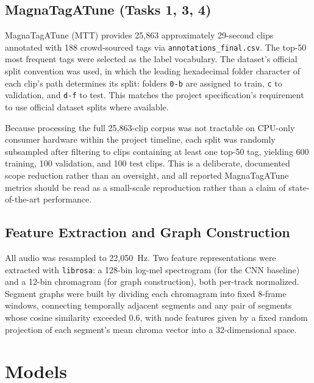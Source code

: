 \documentclass[conference]{IEEEtran}
\begin{document}
\subsection{MagnaTagATune (Tasks 1, 3, 4)}
MagnaTagATune (MTT) provides 25{,}863 approximately 29-second clips annotated with 188 crowd-sourced tags via \texttt{annotations\_final.csv}. The top-50 most frequent tags were selected as the label vocabulary. The dataset's official split convention was used, in which the leading hexadecimal folder character of each clip's path determines its split: folders \texttt{0-b} are assigned to train, \texttt{c} to validation, and \texttt{d-f} to test. This matches the project specification's requirement to use official dataset splits where available.

Because processing the full 25{,}863-clip corpus was not tractable on CPU-only consumer hardware within the project timeline, each split was randomly subsampled after filtering to clips containing at least one top-50 tag, yielding 600 training, 100 validation, and 100 test clips. This is a deliberate, documented scope reduction rather than an oversight, and all reported MagnaTagATune metrics should be read as a small-scale reproduction rather than a claim of state-of-the-art performance.

\subsection{Feature Extraction and Graph Construction}
All audio was resampled to 22{,}050~Hz. Two feature representations were extracted with \texttt{librosa}: a 128-bin log-mel spectrogram (for the CNN baseline) and a 12-bin chromagram (for graph construction), both per-track normalized. Segment graphs were built by dividing each chromagram into fixed 8-frame windows, connecting temporally adjacent segments and any pair of segments whose cosine similarity exceeded 0.6, with node features given by a fixed random projection of each segment's mean chroma vector into a 32-dimensional space.

\section{Models}
\end{document}
